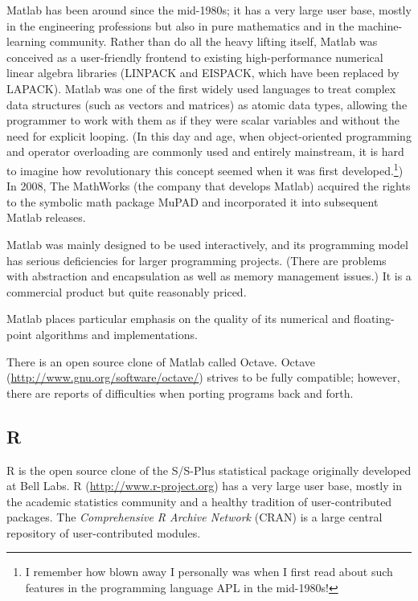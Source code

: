   
Matlab has been around since the mid-1980s; it has a very large user
base, mostly in the engineering professions but also in pure
mathematics and in the machine-learning community. Rather than do all
the heavy lifting itself, Matlab was conceived as a user-friendly
frontend to existing high-performance numerical linear algebra
libraries (LINPACK and EISPACK, which have been replaced by LAPACK).
Matlab was one of the first widely used languages to treat complex
data structures (such as vectors and matrices) as atomic data types,
allowing the programmer to work with them as if they were scalar
variables and without the need for explicit looping.  (In this day and
age, when object-oriented programming and operator overloading are
commonly used and entirely mainstream, it is hard to imagine how
revolutionary this concept seemed when it was first
developed.\footnote{I remember how blown away I personally was when I
  first read about such features in the programming language APL in
  the mid-1980s!}) In 2008, The\vadjust{\pagebreak} MathWorks (the company that develops
Matlab) acquired the rights to the symbolic math package MuPAD and
incorporated it into subsequent Matlab releases.

Matlab was mainly designed to be used interactively, and its
programming model has serious deficiencies for larger programming
projects. (There are problems with abstraction and encapsulation as
well as memory management issues.) It is a commercial product but
quite reasonably priced.

Matlab places particular emphasis on the quality of its numerical
and floating-point algorithms and implementations.

There is an open source clone of Matlab called Octave. Octave  (\url{http://www.gnu.org/}\break \url{software/octave/}) strives
to be fully compatible; however, there are reports of difficulties
when porting programs back and forth.\vspace*{-12pt}


\subsection{R}

 
R is the open source clone of the S/S-Plus statistical package
originally developed at Bell Labs. R (\url{http://www.r-project.org}) has a very large user base,
mostly in the academic statistics community and a healthy tradition
of user-contributed packages. The \emph{Comprehensive R Archive
  Network} (CRAN) is a large central repository of user-contributed
modules.

